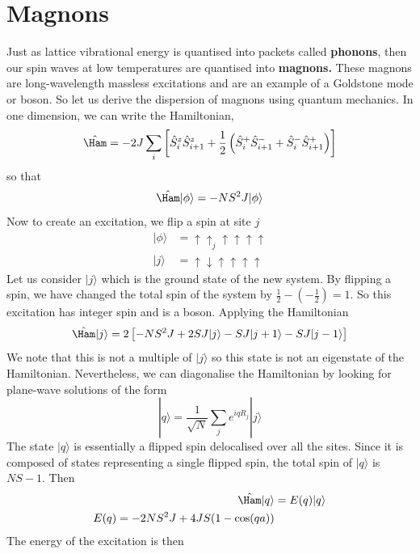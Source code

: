 \documentclass[a4paper, 11pt, normalem]{report}
\begin{document}
\section{Magnons}
Just as lattice vibrational energy is quantised into packets called \textbf{phonons}, then our spin waves at low temperatures are quantised into \textbf{magnons.}
These magnons are long-wavelength massless excitations and are an example of a Goldstone mode or boson. 
So let us derive the dispersion of magnons using quantum mechanics. 
In one dimension, we can write the Hamiltonian,
\begin{equation}
    \hat{\Ham} = -2J\sum_i\left[\hat{S}_i^z\hat{S}_{i+1}^z + \frac12\left(\hat{S}_i^+\hat{S}_{i+1}^- + \hat{S}_i^-\hat{S}_{i+1}^+\right)\right]
\end{equation}
so that
\begin{equation}
    \hat{\Ham}|\phi\rangle = -NS^2J|\phi\rangle
\end{equation}
Now to create an excitation, we flip a spin at site $j$
\begin{align}
    |\phi\rangle &= \uparrow\uparrow_j\uparrow\uparrow\uparrow\uparrow \\
    |j\rangle &= \uparrow\downarrow\uparrow\uparrow\uparrow\uparrow 
\end{align}
Let us consider $|j\rangle$ which is the ground state of the new system. 
By flipping a spin, we have changed the total spin of the system by $\frac12 - (-\frac12) = 1$.
So this excitation has integer spin and is a boson. 
Applying the Hamiltonian
\begin{equation}
    \hat{\Ham}|j\rangle = 2\left[-NS^2J + 2SJ|j\rangle - SJ|j+1\rangle - SJ|j-1\rangle\right]
\end{equation}
We note that this is not a multiple of $|j\rangle$ so this state is not an eigenstate of the Hamiltonian. 
Nevertheless, we can diagonalise the Hamiltonian by looking for plane-wave solutions of the form
\begin{equation}
    |q\rangle = \frac{1}{\sqrt{N}}\sum_j e^{iqR_j}|j\rangle
\end{equation}
The state $|q\rangle$ is essentially a flipped spin delocalised over all the sites. 
Since it is composed of states representing a single flipped spin, the total spin of $|q\rangle$ is $NS-1$.
Then 
\begin{align} 
    \hat{\Ham}|q\rangle &= E(q)|q\rangle \\
    E(q) = -2NS^2J + 4JS(1-\cos(qa))
\end{align}
The energy of the excitation is then
\end{document}
